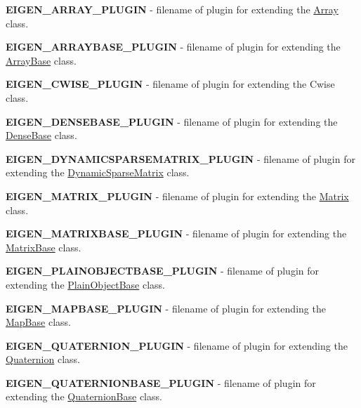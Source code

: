 \begin{DoxyItemize}
\item {\bfseries E\+I\+G\+E\+N\+\_\+\+A\+R\+R\+A\+Y\+\_\+\+P\+L\+U\+G\+IN} -\/ filename of plugin for extending the \hyperlink{group___core___module_class_eigen_1_1_array}{Array} class.
\item {\bfseries E\+I\+G\+E\+N\+\_\+\+A\+R\+R\+A\+Y\+B\+A\+S\+E\+\_\+\+P\+L\+U\+G\+IN} -\/ filename of plugin for extending the \hyperlink{group___core___module_class_eigen_1_1_array_base}{Array\+Base} class.
\item {\bfseries E\+I\+G\+E\+N\+\_\+\+C\+W\+I\+S\+E\+\_\+\+P\+L\+U\+G\+IN} -\/ filename of plugin for extending the Cwise class.
\item {\bfseries E\+I\+G\+E\+N\+\_\+\+D\+E\+N\+S\+E\+B\+A\+S\+E\+\_\+\+P\+L\+U\+G\+IN} -\/ filename of plugin for extending the \hyperlink{group___core___module_class_eigen_1_1_dense_base}{Dense\+Base} class.
\item {\bfseries E\+I\+G\+E\+N\+\_\+\+D\+Y\+N\+A\+M\+I\+C\+S\+P\+A\+R\+S\+E\+M\+A\+T\+R\+I\+X\+\_\+\+P\+L\+U\+G\+IN} -\/ filename of plugin for extending the \hyperlink{class_eigen_1_1_dynamic_sparse_matrix}{Dynamic\+Sparse\+Matrix} class.
\item {\bfseries E\+I\+G\+E\+N\+\_\+\+M\+A\+T\+R\+I\+X\+\_\+\+P\+L\+U\+G\+IN} -\/ filename of plugin for extending the \hyperlink{group___core___module_class_eigen_1_1_matrix}{Matrix} class.
\item {\bfseries E\+I\+G\+E\+N\+\_\+\+M\+A\+T\+R\+I\+X\+B\+A\+S\+E\+\_\+\+P\+L\+U\+G\+IN} -\/ filename of plugin for extending the \hyperlink{group___core___module_class_eigen_1_1_matrix_base}{Matrix\+Base} class.
\item {\bfseries E\+I\+G\+E\+N\+\_\+\+P\+L\+A\+I\+N\+O\+B\+J\+E\+C\+T\+B\+A\+S\+E\+\_\+\+P\+L\+U\+G\+IN} -\/ filename of plugin for extending the \hyperlink{class_eigen_1_1_plain_object_base}{Plain\+Object\+Base} class.
\item {\bfseries E\+I\+G\+E\+N\+\_\+\+M\+A\+P\+B\+A\+S\+E\+\_\+\+P\+L\+U\+G\+IN} -\/ filename of plugin for extending the \hyperlink{class_eigen_1_1_map_base}{Map\+Base} class.
\item {\bfseries E\+I\+G\+E\+N\+\_\+\+Q\+U\+A\+T\+E\+R\+N\+I\+O\+N\+\_\+\+P\+L\+U\+G\+IN} -\/ filename of plugin for extending the \hyperlink{group___geometry___module_class_eigen_1_1_quaternion}{Quaternion} class.
\item {\bfseries E\+I\+G\+E\+N\+\_\+\+Q\+U\+A\+T\+E\+R\+N\+I\+O\+N\+B\+A\+S\+E\+\_\+\+P\+L\+U\+G\+IN} -\/ filename of plugin for extending the \hyperlink{group___geometry___module_class_eigen_1_1_quaternion_base}{Quaternion\+Base} class.

\end{DoxyItemize}
